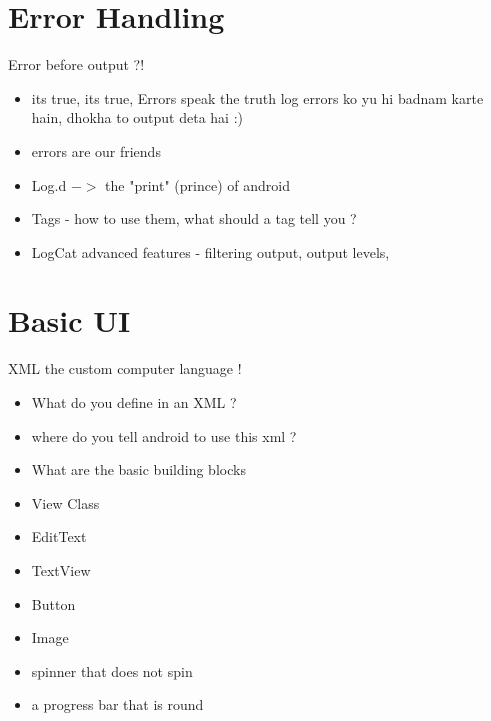 \documentclass[11pt]{beamer}
\begin{document}
\section{Error Handling}

\begin{frame}[containsverbatim]{Error before output ?!}

	\begin{flushleft}
	\begin{itemize}
		\item its true, its true, Errors speak the truth
                log errors ko yu hi badnam karte hain, dhokha to output deta hai :)
		\item errors are our friends
		\item Log.d $->$ the "print" (prince) of android 
		\item Tags - how to use them, what should a tag tell you ?
		\item LogCat advanced features - filtering output, output levels, 
	\end{itemize}
	\end{flushleft}
\end{frame}

\section{Basic UI}

\begin{frame}[containsverbatim]{XML the custom computer language !}
	\begin{flushleft}
	\begin{itemize}
		\item What do you define in an XML ?
		\item where do you tell android to use this xml ?
		\item What are the basic building blocks
		\item View Class
		\item EditText
		\item TextView
		\item Button
		\item Image 
		\item spinner that does not spin 
		\item a progress bar that is round
	\end{itemize}
	\end{flushleft}
\end{frame}

\end{document}
